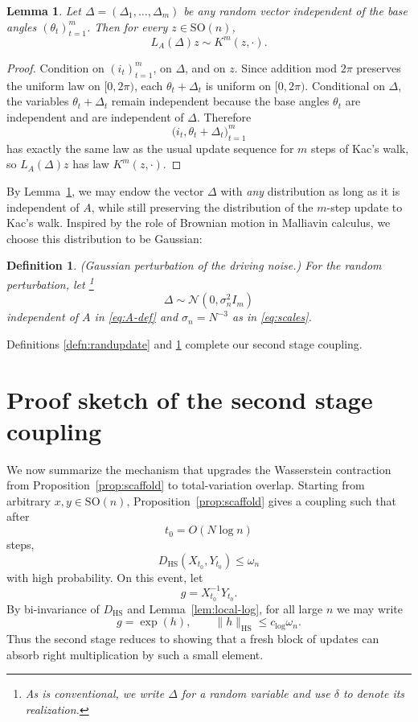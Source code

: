 \documentclass[11pt, reqno]{amsart}
\numberwithin{equation}{section}
\newtheorem{definition}{Definition}
\newtheorem{lemma}{Lemma}
\theoremstyle{remark}
\newcommand{\1}{\mathbf{1}}
\newcommand{\SO}{\mathrm{SO}}
\newcommand{\HS}{\mathrm{HS}}
\begin{document}
\begin{lemma}
\label{lem:marginal}
Let $\Delta=(\Delta_1,\dots,\Delta_m)$ be any random vector independent of the base angles
$(\theta_t)_{t=1}^m$.
Then for every $z\in \SO(n)$,
\[
L_A(\Delta)z \sim K^m(z,\cdot).
\]
\end{lemma}

\begin{proof}
Condition on $(i_t)_{t=1}^m$, on $\Delta$, and on $z$.
Since addition mod $2\pi$ preserves the uniform law on $[0,2\pi)$,
each $\theta_t+\Delta_t$ is uniform on $[0,2\pi)$.
Conditional on $\Delta$, the variables $\theta_t+\Delta_t$ remain independent because the
base angles $\theta_t$ are independent and are independent of $\Delta$.
Therefore
\[
\bigl(i_t,\theta_t+\Delta_t\bigr)_{t=1}^m
\]
has exactly the same law as the usual update sequence for $m$ steps of Kac's walk,
so $L_A(\Delta)z$ has law $K^m(z,\cdot)$.
\end{proof}

By Lemma~\ref{lem:marginal},  we may endow the vector $\Delta$ with \emph{any} distribution as long as it is independent of $A$, while still preserving the distribution of the $m$-step update to Kac's walk. Inspired by the role of Brownian motion in Malliavin calculus, we choose this distribution to be Gaussian:
\begin{definition} (Gaussian perturbation of the driving noise.) \label{defn:randupdate2}
For the random perturbation, let \footnote{As is conventional, we write $\Delta$ for 
a random variable and use $\delta$ to denote its realization.}
\begin{equation}\label{eq:Deltadef}
\Delta\sim \mathcal N(0,\sigma_n^2 I_m)
\end{equation}
independent of $A$ in \eqref{eq:A-def} and $\sigma_n = N^{-3}$ as in \eqref{eq:scales}.
\end{definition}
Definitions \ref{defn:randupdate} and \ref{defn:randupdate2} complete our second stage coupling.

\section{Proof sketch of the second stage coupling}
\label{SecProofSketch}

We now summarize the mechanism that upgrades the Wasserstein contraction from
Proposition~\ref{prop:scaffold} to total-variation overlap. Starting from arbitrary $x,y\in\SO(n)$, Proposition~\ref{prop:scaffold} gives a
coupling such that after
\[
t_0=O(N\log n)
\]
steps,
\[
D_{\HS}(X_{t_0},Y_{t_0})\le \omega_n
\]
with high probability. On this event, let
\[
g=X_{t_0}^{-1}Y_{t_0}.
\]
By bi-invariance of $D_{\HS}$ and Lemma~\ref{lem:local-log}, for all large $n$ we
may write
\[
g=\exp(h),
\qquad
\|h\|_{\HS}\le c_{\log}\omega_n.
\]
Thus the second stage reduces to showing that a fresh block of updates can absorb
right multiplication by such a small element.
\end{document}
